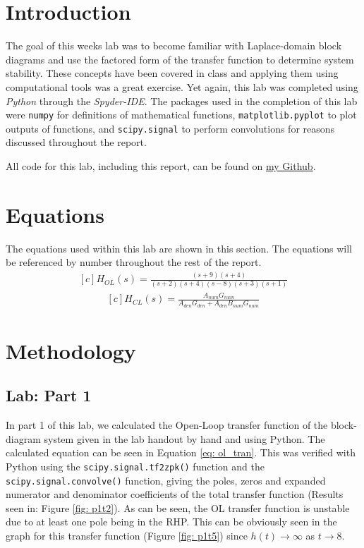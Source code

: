 \documentclass[12pt]{report}
\begin{document}
\section{Introduction}
The goal of this weeks lab was to become familiar with Laplace-domain block diagrams and use the factored form of the transfer function to determine system stability.
These concepts have been covered in class and applying them using computational tools was a great exercise.
Yet again, this lab was completed using \textit{Python} through the \textit{Spyder-IDE}. The packages used in the completion of this lab were \texttt{numpy} for 
definitions of mathematical functions, \texttt{matplotlib.pyplot} to plot outputs of functions, and \texttt{scipy.signal} to perform convolutions for reasons discussed
throughout the report.

All code for this lab, including this report, can be found on \href{http://github.com/mac-edmondson}{my Github}.
\section{Equations}\label{section: eq}
The equations used within this lab are shown in this section. The equations will be referenced by number throughout the rest of the report.
\begin{equation}\label{eq: ol_tran}
  \begin{aligned}[c]
    H_{OL}(s) = \frac{(s+9)(s+4)}{(s+2)(s+4)(s-8)(s+3)(s+1)}
  \end{aligned}
\end{equation}
\begin{equation}\label{eq: cl_tran}
  \begin{aligned}[c]
    H_{CL}(s) = \frac{A_{num}G_{num}}{A_{den}G_{den} + A_{den}B_{num}G_{num}}
  \end{aligned}
\end{equation}

\section{Methodology}
\subsection{Lab: Part 1}\label{Section: Part1}
In part 1 of this lab, we calculated the Open-Loop transfer function of the block-diagram system given in the lab handout by hand and using Python.
The calculated equation can be seen in Equation \ref{eq: ol_tran}. This was verified with Python using the \texttt{scipy.signal.tf2zpk()} function
and the \texttt{scipy.signal.convolve()} function, giving the poles, zeros and expanded numerator and denominator coefficients of the total transfer function
(Results seen in: Figure \ref{fig: p1t2}). As can be seen, the OL transfer function is unstable due to at least one pole being in the RHP. This can be obviously seen
in the graph for this transfer function (Figure \ref{fig: p1t5}) since \(h(t)\to\infty\) as \(t\to 8\). 
\end{document}
